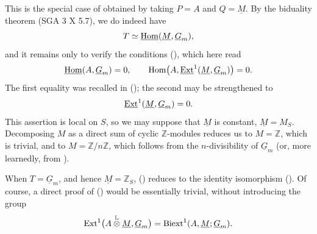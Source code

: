 This is the special case of  obtained by taking $P=A$ and
$Q=\underline M$.  By the biduality theorem (SGA 3 X 5.7), we do
indeed have
\[
 T\simeq\uHom(\underline M,\underline G_m),
\]
and it remains only to verify the conditions (), which here read
\[
 \uHom(A,\underline G_m)=0,
 \qquad
 \Hom\bigl(A,\uExt^1(\underline M,\underline G_m)\bigr)=0.
\]
The first equality was recalled in (); the second may be
strengthened to
\[
 \uExt^1(\underline M,\underline G_m)=0.
\]
This assertion is local on $S$, so we may suppose that $\underline
M$ is constant, $\underline M=M_S$.  Decomposing $M$ as a direct sum
of cyclic $\mathbb Z$-modules reduces us to $M=\mathbb Z$, which is
trivial, and to $M=\mathbb Z/n\mathbb Z$, which follows from the
$n$-divisibility of $\underline G_m$ (or, more learnedly, from
).

When $T=\underline G_m$, and hence $\underline M=\mathbb Z_S$,
() reduces to the identity isomorphism ().  Of course, a
direct proof of () would be essentially trivial, without
introducing the group
\[
 \Ext^1\bigl(A\mathbin{\mathop{\otimes}^{\mathbb L}}\underline M,
              \underline G_m\bigr)
 =\Biext^1(A,\underline M;\underline G_m).
\]

